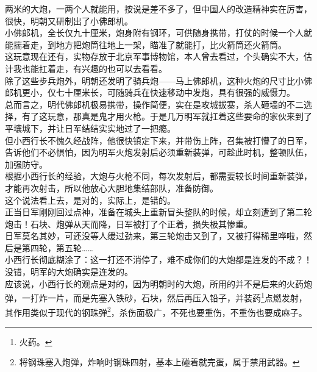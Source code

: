 \begin{multicols}{\theparacolNo}
两米的大炮，一两个人就能用，按说是差不多了，但中国人的改造精神实在厉害，很快，明朝又研制出了小佛郎机。\\

小佛郎机，全长仅九十厘米，炮身附有钢环，可供随身携带，打仗的时候一个人就能揣着走，到地方把炮筒往地上一架，瞄准了就能打，比火箭筒还火箭筒。\\

这玩意现在还有，实物存放于北京军事博物馆，本人曾去看过，个头确实不大，估计我也能扛着走，有兴趣的也可以去看看。\\

除了这些步兵炮外，明朝还发明了骑兵炮——马上佛郎机，这种火炮的尺寸比小佛郎机更小，仅七十厘米长，可随骑兵在快速移动中发炮，具有很强的威慑力。\\

总而言之，明代佛郎机极易携带，操作简便，实在是攻城拔寨，杀人砸墙的不二选择，有了这玩意，那真是鬼才用火枪。于是几万明军就扛着这些要命的家伙来到了平壤城下，并让日军结结实实地过了一把瘾。\\

但小西行长不愧久经战阵，他很快镇定下来，并带伤上阵，召集被打懵了的日军，告诉他们不必惧怕，因为明军火炮发射后必须重新装弹，可趁此时机，整顿队伍，加强防守。\\

根据小西行长的经验，大炮与火枪不同，每次发射后，都需要较长时间重新装弹，才能再次射击，所以他放心大胆地集结部队，准备防御。\\

这个说法看上去，是对的，实际上，是错的。\\

正当日军刚刚回过点神，准备在城头上重新冒头整队的时候，却立刻遭到了第二轮炮击！石块、炮弹从天而降，日军被打了个正着，损失极其惨重。\\

日军莫名其妙，可还没等人缓过劲来，第三轮炮击又到了，又被打得稀里哗啦，然后是第四轮，第五轮……\\

小西行长彻底糊涂了：这一打还不消停了，难不成你们的大炮都是连发的不成？！\\

没错，明军的大炮确实是连发的。\\

应该说，小西行长的观点是对的，因为明朝时的大炮，所用的并不是后来的火药炮弹，一打炸一片，而是先塞入铁砂，石块，然后再压入铅子，并装药\footnote{火药。}点燃发射，其作用类似于现代的钢珠弹\footnote{将钢珠塞入炮弹，炸响时钢珠四射，基本上碰着就完蛋，属于禁用武器。}，杀伤面极广，不死也要重伤，不重伤也要成麻子。\\


\end{multicols}

